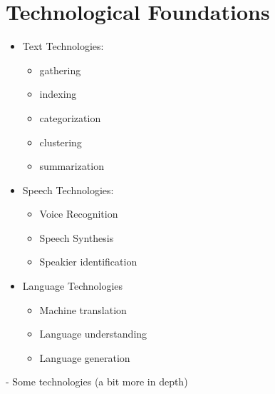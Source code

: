 \documentclass[11pt]{article}
\newenvironment{itemise}{
\begin{itemize}
  \setlength{\itemsep}{1pt}
  \setlength{\parskip}{0pt}
  \setlength{\parsep}{0pt}
}{\end{itemize}}
\begin{document}
\newpage\section{Technological Foundations}
\begin{itemise}
 \item Text Technologies:
\begin{itemise}
 \item gathering
 \item indexing
 \item categorization
 \item clustering
 \item summarization
\end{itemise}
 \item Speech Technologies:
\begin{itemise}
 \item Voice Recognition
 \item Speech Synthesis
 \item Speakier identification
\end{itemise}
 \item Language Technologies
\begin{itemise}
 \item Machine translation
 \item Language understanding
 \item Language generation
\end{itemise}
\end{itemise}
- Some technologies (a bit more in depth)
\end{document}
